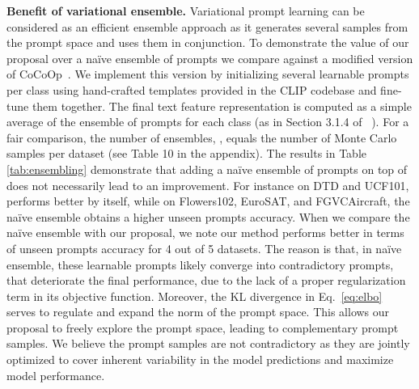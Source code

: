 \documentclass[10pt,twocolumn,letterpaper]{article}
\begin{document}
\begin{table}[t!]
\centering
\caption{\textbf{Effect of prompt initialization.} Initializing the context tokens with an appropriate prompt ``An image of a '' (denoted as Guided) improves the performance compared to random initialization.}
\vspace{-2mm}
\label{tab:ablation-prompt-init}
\vspace{-5mm}
\end{table} 

\textbf{Benefit of variational ensemble.} 
Variational prompt learning can be considered as an efficient ensemble approach as it generates several samples from the prompt space and uses them in conjunction. To demonstrate the value of our proposal over a na\"ive ensemble of prompts we compare against a modified version of CoCoOp~\cite{zhou2022conditional}. We implement this version by initializing several learnable prompts per class using  hand-crafted templates provided in the CLIP codebase and fine-tune them together. 
The final text feature representation is computed as a simple average of the ensemble of prompts for each class (as in Section 3.1.4 of ~\cite{clip_icml21}). For a fair comparison, the number of ensembles, , equals the number of Monte Carlo samples  per dataset (see Table 10 in the appendix). 
The results in Table \ref{tab:ensembling} demonstrate that adding a na\"ive ensemble of prompts on top of \cocoop does not necessarily lead to an improvement.
For instance on DTD and UCF101, \cocoop performs better by itself, while on Flowers102, EuroSAT, and FGVCAircraft, the na\"ive ensemble obtains a higher unseen prompts accuracy. 
When we compare the na\"ive ensemble with our proposal, we note our method performs better in terms of unseen prompts accuracy for 4 out of 5 datasets. The reason is that, in na\"ive ensemble, these  learnable prompts likely converge into contradictory prompts, that deteriorate the final performance, due to the lack of a proper regularization term in its objective function. 
Moreover, the KL divergence in Eq.~\ref{eq:elbo} serves to regulate and expand the norm of the prompt space. This allows our proposal to freely explore the prompt space, leading to complementary prompt samples. We believe the prompt samples are not contradictory as they are jointly optimized to cover inherent variability in the model predictions and maximize model performance.
\end{document}
